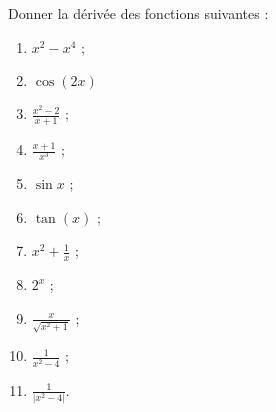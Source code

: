
\begin{exercice}\label{exoDerive-0001}

	Donner la dérivée des fonctions suivantes :
	\begin{enumerate}
		\item 
			$\displaystyle x^2-x^4$ ;
		\item
			$\cos(2x)$
		\item
			$\displaystyle \frac{x^2-2}{x+1}$ ;
		\item
			$\displaystyle \frac{x+1}{x^3}$ ;
		\item
			$\displaystyle \sin x$ ;
		\item
			$\displaystyle \tan(x)$ ;
		\item
			$\displaystyle x^2+\frac{1}{x}$ ;
		\item
			$\displaystyle  2^x$ ;
		\item
			$\displaystyle \frac{x}{\sqrt{x^2+1}}$ ;
		\item
			$\displaystyle \frac{1}{x^2-4}$ ;
		\item
			$\displaystyle \frac{1}{|x^2-4|}$.
\end{enumerate}

\end{exercice}
